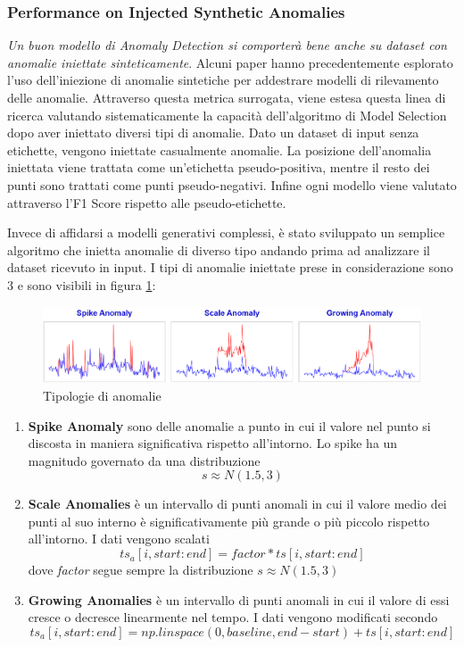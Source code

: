 \subsubsection{Performance on Injected Synthetic Anomalies}
\textit{Un buon modello di Anomaly Detection si comporterà bene anche su dataset con anomalie iniettate sinteticamente}. Alcuni paper hanno precedentemente esplorato l'uso dell'iniezione di anomalie sintetiche per addestrare modelli di rilevamento delle anomalie. Attraverso questa metrica surrogata, viene estesa questa linea di ricerca valutando sistematicamente la capacità dell'algoritmo di Model Selection dopo aver iniettato diversi tipi di anomalie. Dato un dataset di input senza etichette, vengono iniettate casualmente anomalie. La posizione dell'anomalia iniettata viene trattata come un'etichetta pseudo-positiva, mentre il resto dei punti sono trattati come punti pseudo-negativi. 
Infine ogni modello viene valutato attraverso l'F1 Score rispetto alle pseudo-etichette.

Invece di affidarsi a modelli generativi complessi, è stato sviluppato un semplice algoritmo che inietta anomalie di diverso tipo andando prima ad analizzare il dataset ricevuto in input. I tipi di anomalie iniettate prese in considerazione sono 3 e sono visibili in figura \ref{tipi-anomalie}: 
\begin{figure}[t]
	\centering
	\includegraphics[width=14cm, scale=1]{images/anomalies}
	\caption{Tipologie di anomalie}
	\label{tipi-anomalie}
		
\end{figure}


\begin{enumerate}
	\item \textbf{Spike Anomaly} sono delle anomalie a punto in cui il valore nel punto si discosta in maniera significativa rispetto all'intorno. Lo spike ha un magnitudo governato da una distribuzione \[s \approx N(1.5, 3) \]
	\item \textbf{Scale Anomalies} è un intervallo di punti anomali in cui il  valore medio dei punti al suo interno è significativamente più grande o più piccolo rispetto all'intorno. I dati vengono scalati \[ ts_a[i, start:end] = factor*ts[i, start:end]\] dove \textit{factor} segue sempre la distribuzione \(s \approx N(1.5, 3) \)
	\item \textbf{Growing Anomalies} è un intervallo di punti anomali in cui il valore di essi cresce o decresce linearmente nel tempo. I dati vengono modificati secondo \[ ts_a[i, start:end] = np.linspace(0, baseline, end-start) + ts[i, start:end] \] 
\end{enumerate}

